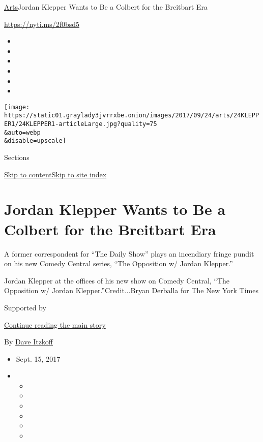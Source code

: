 \href{/section/arts}{Arts}\textbar{}Jordan Klepper Wants to Be a Colbert
for the Breitbart Era

\url{https://nyti.ms/2f0bsd5}

\begin{itemize}
\item
\item
\item
\item
\item
\item
\end{itemize}

\texttt{[image: https://static01.graylady3jvrrxbe.onion/images/2017/09/24/arts/24KLEPPER1/24KLEPPER1-articleLarge.jpg?quality=75\\\&auto=webp\\\&disable=upscale]}

Sections

\protect\hyperlink{site-content}{Skip to
content}\protect\hyperlink{site-index}{Skip to site index}

\hypertarget{jordan-klepper-wants-to-be-a-colbert-for-the-breitbart-era}{%
\section{Jordan Klepper Wants to Be a Colbert for the Breitbart
Era}\label{jordan-klepper-wants-to-be-a-colbert-for-the-breitbart-era}}

A former correspondent for ``The Daily Show'' plays an incendiary fringe
pundit on his new Comedy Central series, ``The Opposition w/ Jordan
Klepper.''

Jordan Klepper at the offices of his new show on Comedy Central, ``The
Opposition w/ Jordan Klepper.''Credit...Bryan Derballa for The New York
Times

Supported by

\protect\hyperlink{after-sponsor}{Continue reading the main story}

By \href{http://www.nytimes3xbfgragh.onion/by/dave-itzkoff}{Dave
Itzkoff}

\begin{itemize}
\item
  Sept. 15, 2017
\item
  \begin{itemize}
  \item
  \item
  \item
  \item
  \item
  \item
  \end{itemize}
\end{itemize}

